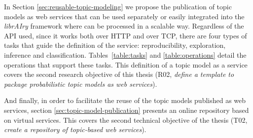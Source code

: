 In Section \ref{sec:reusable-topic-modeling} we propose the publication of topic models as web services that can be used separately or easily integrated into the \textit{librAIry} framework where can be processed in a scalable way. Regardless of the API used, since it works both over HTTP and over TCP, there are four types of tasks that guide the definition of the service: reproducibility, exploration, inference and classification. Tables~\ref{table:tasks} and \ref{table:operations} detail the operations that support these tasks. This definition of a topic model as a service covers the second research objective of this thesis (R02, \textit{define a template to package probabilistic topic models as web services}).
 
And finally, in order to facilitate the reuse of the topic models published as web services, section \ref{sec:topic-model-publication} presents an online repository based on virtual services. This covers the second technical objective of the thesis (T02, \textit{create a repository of topic-based web services}). 
 

